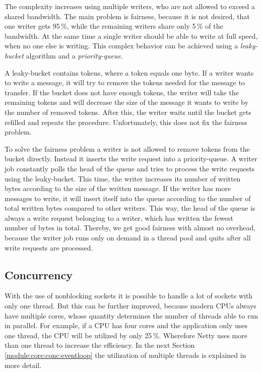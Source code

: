 The complexity increases using multiple writers, who are not allowed to exceed a shared bandwidth. The main problem is fairness, because it is not desired, that one writer gets 95\,\%, while the remaining writers share only 5\,\% of the bandwidth. At the same time a single writer should be able to write at full speed, when no one else is writing. This complex behavior can be achieved using a \emph{leaky-bucket} algorithm and a \emph{priority-queue}.

A leaky-bucket contains tokens, where a token equals one byte. If a writer wants to write a message, it will try to remove the tokens needed for the message to transfer. If the bucket does not have enough tokens, the writer will take the remaining tokens and will decrease the size of the message it wants to write by the number of removed tokens. After this, the writer waits until the bucket gets refilled and repeats the procedure. Unfortunately, this does not fix the fairness problem.

To solve the fairness problem a writer is not allowed to remove tokens from the bucket directly. Instead it inserts the write request into a priority-queue. A writer job constantly polls the head of the queue and tries to process the write requests using the leaky-bucket. This time, the writer increases its number of written bytes according to the size of the written message. If the writer has more messages to write, it will insert itself into the queue according to the number of total written bytes compared to other writers. This way, the head of the queue is always a write request belonging to a writer, which has written the fewest number of bytes in total. Thereby, we get good fairness with almost no overhead, because the writer job runs only on demand in a thread pool and quits after all write requests are processed.


\subsection{Concurrency}
With the use of nonblocking sockets it is possible to handle a lot of sockets with only one thread. But this can be further improved, because modern CPUs always have multiple cores, whose quantity determines the number of threads able to run in parallel. For example, if a CPU has four cores and the application only uses one thread, the CPU will be utilized by only 25\,\%. Wherefore Netty uses more than one thread to increase the efficiency. In the next Section \ref{module:core:conc:eventloop} the utilization of multiple threads is explained in more detail.

